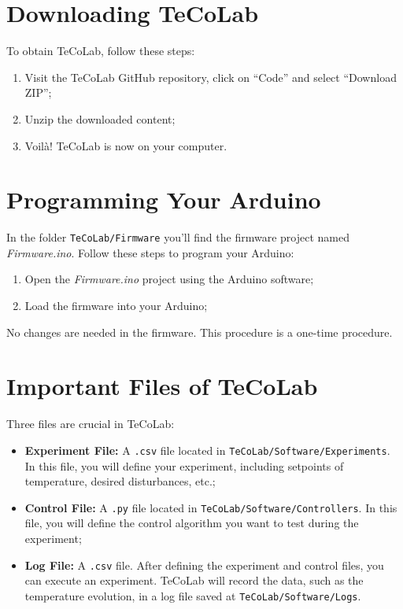 \documentclass[12pt]{report}
\begin{document}
\section{Downloading TeCoLab}

To obtain TeCoLab, follow these steps:

\begin{enumerate}
    \item Visit the TeCoLab GitHub repository, click on ``Code'' and select ``Download ZIP'';
    \item Unzip the downloaded content;
    \item Voilà! TeCoLab is now on your computer.
\end{enumerate}

\section{Programming Your Arduino}

In the folder \texttt{TeCoLab/Firmware} you'll find the firmware project named \emph{Firmware.ino}. Follow these steps to program your Arduino:

\begin{enumerate}
    \item Open the \emph{Firmware.ino} project using the Arduino software;
    \item Load the firmware into your Arduino;
\end{enumerate}

No changes are needed in the firmware. This procedure is a one-time procedure.

\section{Important Files of TeCoLab}

Three files are crucial in TeCoLab:

\begin{itemize}
    \item \textbf{Experiment File:} A \texttt{.csv} file located in \texttt{TeCoLab/Software/Experiments}. In this file, you will define your experiment, including setpoints of temperature, desired disturbances, etc.;
    \item \textbf{Control File:} A \texttt{.py} file located in \texttt{TeCoLab/Software/Controllers}. In this file, you will define the control algorithm you want to test during the experiment;
    \item \textbf{Log File:} A \texttt{.csv} file. After defining the experiment and control files, you can execute an experiment. TeCoLab will record the data, such as the temperature evolution, in a log file saved at \texttt{TeCoLab/Software/Logs}.
\end{itemize}
\end{document}
